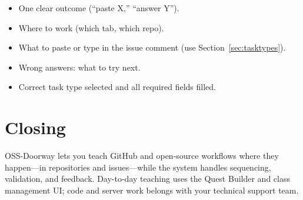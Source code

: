 \documentclass[11pt,a4paper]{article}
\begin{document}
\begin{itemize}[leftmargin=*,label=$\square$]
  \item One clear outcome (``paste X,'' ``answer Y'').
  \item Where to work (which tab, which repo).
  \item What to paste or type in the issue comment (use Section~\ref{sec:tasktypes}).
  \item Wrong answers: what to try next.
  \item Correct task type selected and all required fields filled.
\end{itemize}

\section{Closing}

OSS-Doorway lets you teach GitHub and open-source workflows where they happen---in repositories and issues---while the system handles sequencing, validation, and feedback. Day-to-day teaching uses the Quest Builder and class management UI; code and server work belongs with your technical support team.
\end{document}
